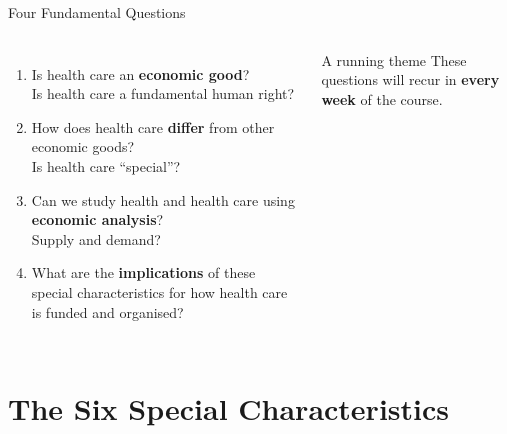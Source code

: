 \documentclass[aspectratio=169, 12pt]{beamer}
\begin{document}
\begin{frame}{Four Fundamental Questions}
	\begin{columns}
		\begin{enumerate}
			\item Is health care an \textbf{economic good}?\\
			{\small \textcolor{AccentBlue}{Is health care a fundamental human right?}}
			\vspace{0.5em}
			\item How does health care \textbf{differ} from other economic goods?\\
			{\small \textcolor{AccentBlue}{Is health care ``special''?}}
			\vspace{0.5em}
			\item Can we study health and health care using \textbf{economic analysis}?\\
			{\small \textcolor{AccentBlue}{Supply and demand?}}
			\vspace{0.5em}
			\item What are the \textbf{implications} of these special characteristics for how health
			care is funded and organised?
		\end{enumerate}
		\begin{alertblock}{A running theme}
			These questions will recur in \textbf{every week} of the course.
		\end{alertblock}
	\end{columns}
\end{frame}

\section{The Six Special Characteristics}
\end{document}
